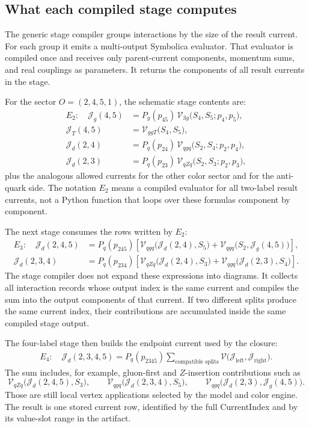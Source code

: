 \documentclass[10pt]{article}
\newcommand{\J}{\mathcal{J}}
\newcommand{\V}{\mathcal{V}}
\begin{document}
\subsection*{What each compiled stage computes}

The generic stage compiler groups interactions by the size of the result
current.  For each group it emits a multi-output Symbolica evaluator.  That
evaluator is compiled once and receives only parent-current components,
momentum sums, and real couplings as parameters.  It returns the components of
all result currents in the stage.

For the sector $O=(2,4,5,1)$, the schematic stage contents are:
\begin{align}
E_2:\quad
  \J_g(4,5) &=
    P_g(p_{45})\,\V_{3g}\bigl(S_4,S_5;p_4,p_5\bigr),\\
  \J_T(4,5) &=
    \V_{ggT}\bigl(S_4,S_5\bigr),\\
  \J_d(2,4) &=
    P_q(p_{24})\,\V_{qgq}\bigl(S_2,S_4;p_2,p_4\bigr),\\
  \J_d(2,3) &=
    P_q(p_{23})\,\V_{qZq}\bigl(S_2,S_3;p_2,p_3\bigr),
    \label{eq:e2-stage}
\end{align}
plus the analogous allowed currents for the other color sector and for the
anti-quark side.  The notation $E_2$ means a compiled evaluator for all
two-label result currents, not a Python function that loops over these
formulas component by component.

The next stage consumes the rows written by $E_2$:
\begin{align}
E_3:\quad
  \J_d(2,4,5) &=
    P_q(p_{245})\left[
      \V_{qgq}\bigl(\J_d(2,4),S_5\bigr)
      + \V_{qgq}\bigl(S_2,\J_g(4,5)\bigr)
    \right],\\
  \J_d(2,3,4) &=
    P_q(p_{234})\left[
      \V_{qZq}\bigl(\J_d(2,4),S_3\bigr)
      + \V_{qgq}\bigl(\J_d(2,3),S_4\bigr)
    \right].
    \label{eq:e3-stage}
\end{align}
The stage compiler does not expand these expressions into diagrams.  It
collects all interaction records whose output index is the same current and
compiles the sum into the output components of that current.  If two different
splits produce the same current index, their contributions are accumulated
inside the same compiled stage output.

The four-label stage then builds the endpoint current used by the closure:
\begin{align}
E_4:\quad
  \J_d(2,3,4,5) =
    P_q(p_{2345})
    \sum_{\text{compatible splits}}
      \V\bigl(\J_{\mathrm{left}},\J_{\mathrm{right}}\bigr).
    \label{eq:e4-stage}
\end{align}
The sum includes, for example, gluon-first and $Z$-insertion contributions such
as
\[
  \V_{qZq}\bigl(\J_d(2,4,5),S_3\bigr),\qquad
  \V_{qgq}\bigl(\J_d(2,3,4),S_5\bigr),\qquad
  \V_{qgq}\bigl(\J_d(2,3),\J_g(4,5)\bigr).
\]
Those are still local vertex applications selected by the model and color
engine.  The result is one stored current row, identified by the full
CurrentIndex and by its value-slot range in the artifact.
\end{document}
